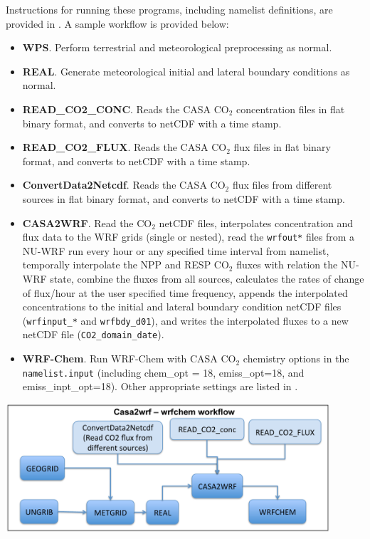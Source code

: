 Instructions for running these programs, including namelist definitions,
are provided in \cite{ref:Casa2WrfUserGuide}. A sample workflow is provided 
below:

\begin{itemize}

\item \textbf{WPS}. Perform terrestrial and meteorological preprocessing
  as normal.

\item \textbf{REAL}. Generate meteorological initial and lateral boundary 
  conditions as normal.

\item \textbf{READ\_CO2\_CONC}. Reads the CASA CO$_2$ concentration files in 
  flat binary format, and converts to netCDF with a time stamp. 

\item \textbf{READ\_CO2\_FLUX}. Reads the CASA CO$_2$ flux files in 
  flat binary format, and converts to netCDF with a time stamp. 
  
\item \textbf{ConvertData2Netcdf}. Reads the CASA CO$_2$ flux files from 
  different sources in flat binary format, and converts to netCDF with a time 
  stamp. 
  
\item \textbf{CASA2WRF}. Read the CO$_2$ netCDF files, interpolates 
  concentration and flux data to the WRF grids (single or nested), read the 
  \texttt{wrfout*} files from a NU-WRF run every hour or any specified time 
  interval from namelist, temporally interpolate the NPP and RESP CO$_2$ 
  fluxes with relation the NU-WRF state, combine the fluxes from all sources, 
  calculates the rates of change of flux/hour at the user specified time 
  frequency, appends the interpolated concentrations to the initial and 
  lateral boundary condition netCDF files (\texttt{wrfinput\_*} and 
  \texttt{wrfbdy\_d01}), and writes the interpolated fluxes to a new netCDF 
  file (\texttt{CO2\_domain\_date}).

\item \textbf{WRF-Chem}. Run WRF-Chem with CASA CO$_2$ chemistry options in the
  \texttt{namelist.input} (including chem\_opt = 18, emiss\_opt=18, and 
  emiss\_inpt\_opt=18). Other appropriate settings are listed in
  \cite{ref:Casa2WrfUserGuide}.

\end{itemize}

\centerline{\includegraphics[width=4.75in]{CASA_Flux}}

